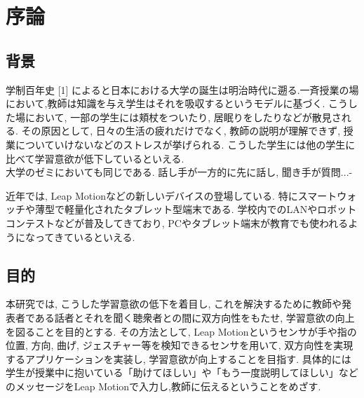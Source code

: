 \documentclass{funthesis}
\begin{document}
\chapter{序論} %


\section{背景} %


学制百年史 [1] によると日本における大学の誕生は明治時代に遡る.一斉授業の場において,教師は知識を与え学生はそれを吸収するというモデルに基づく. こうした場において, 一部の学生には頬杖をついたり, 居眠りをしたりなどが散見される. その原因として, 日々の生活の疲れだけでなく, 教師の説明が理解できず, 授業についていけないなどのストレスが挙げられる. こうした学生には他の学生に比べて学習意欲が低下しているといえる.\\
大学のゼミにおいても同じである. 話し手が一方的に先に話し, 聞き手が質問...-



近年では, Leap Motionなどの新しいデバイスの登場している. 特にスマートウォッチや薄型で軽量化されたタブレット型端末である. 学校内でのLANやロボットコンテストなどが普及してきており,  PCやタブレット端末が教育でも使われるようになってきているといえる. 

\section{目的}
本研究では, こうした学習意欲の低下を着目し, これを解決するために教師や発表者である話者とそれを聞く聴衆者との間に双方向性をもたせ,  学習意欲の向上を図ることを目的とする. その方法として, Leap Motionというセンサが手や指の位置, 方向, 曲げ, ジェスチャー等を検知できるセンサを用いて, 双方向性を実現するアプリケーションを実装し, 学習意欲が向上することを目指す. 具体的には学生が授業中に抱いている「助けてほしい」や「もう一度説明してほしい」などのメッセージをLeap Motionで入力し,教師に伝えるということをめざす. 
\end{document}
